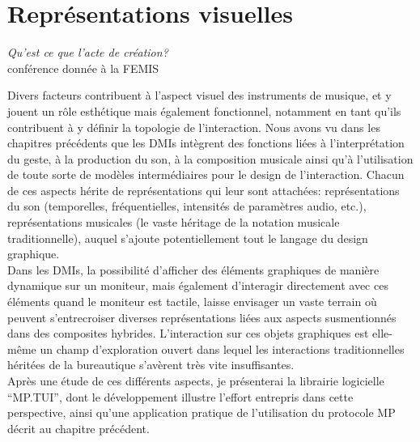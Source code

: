 %
\chapter{Représentations visuelles}
\label{ch:visual_representation}

{\textit{Qu'est ce que l'acte de création?}\\
conférence donnée à la FEMIS \cite{deleuze_deux_2003}}

\vspace*{\fill}


\noindent Divers facteurs contribuent à l'aspect visuel des instruments de musique, et y jouent un rôle esthétique mais également fonctionnel, notamment en tant qu'ils contribuent à y définir la topologie de l'interaction. Nous avons vu dans les chapitres précédents que les \glspl{DMI} intègrent des fonctions liées à l'interprétation du geste, à la production du son, à la composition musicale ainsi qu'à l'utilisation de toute sorte de modèles intermédiaires pour le design de l'interaction. Chacun de ces aspects hérite de représentations qui leur sont attachées: représentations du son (temporelles, fréquentielles, intensités de paramètres audio, etc.), représentations musicales (le vaste héritage de la notation musicale traditionnelle), auquel s'ajoute potentiellement tout le langage du design graphique.\\
\indent Dans les \glspl{DMI}, la possibilité d'afficher des éléments graphiques de manière dynamique sur un moniteur, mais également d'interagir directement avec ces éléments quand le moniteur est tactile, laisse envisager un vaste terrain où peuvent s'entrecroiser diverses représentations liées aux aspects susmentionnés dans des composites hybrides. L'interaction sur ces objets graphiques est elle-même un champ d'exploration ouvert dans lequel les interactions traditionnelles héritées de la bureautique s'avèrent très vite insuffisantes.\\
\indent Après une étude de ces différents aspects, je présenterai la librairie logicielle ``MP.TUI'', dont le développement illustre l'effort entrepris dans cette perspective, ainsi qu'une application pratique de l'utilisation du protocole MP décrit au chapitre précédent.

